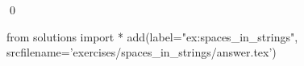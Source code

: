 
\begin{ex} 
  \label{ex:spaces_in_strings}
  
  \qed
\end{ex} 
\begin{python0}
from solutions import *
add(label="ex:spaces_in_strings",
    srcfilename='exercises/spaces_in_strings/answer.tex') 
\end{python0}
